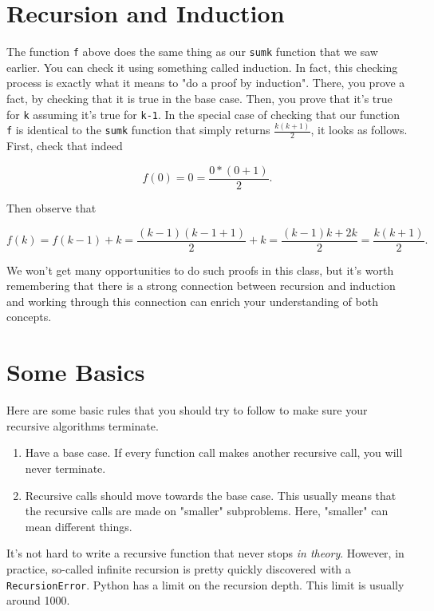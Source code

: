 \section{Recursion and Induction}


The function \texttt{f} above does the same thing as our \texttt{sumk} function that we saw earlier.
You can check it using something called induction.
In fact, this checking process is exactly what it means to "do a proof by induction".
There, you prove a fact, by checking that it is true in the base case.
Then, you prove that it's true for \texttt{k} assuming it's true for \texttt{k-1}.
In the special case of checking that our function \texttt{f} is identical to the \texttt{sumk} function that simply returns $\frac{k(k+1)}{2}$, it looks as follows.
First, check that indeed


\[
  f(0) = 0 = \frac{0 * (0 + 1)}{2}.
\]


Then observe that


\[
    f(k) = f(k-1) + k = \frac{(k-1)(k-1 + 1)}{2} + k = \frac{(k-1)k + 2k}{2} = \frac{k(k+1)}{2}.
\]


We won't get many opportunities to do such proofs in this class, but it's worth remembering that there is a strong connection between recursion and induction and working through this connection can enrich your understanding of both concepts.

\section{Some Basics}


Here are some basic rules that you should try to follow to make sure your recursive algorithms terminate.

\begin{enumerate}

\item Have a base case.  If every function call makes another recursive call, you will never terminate.

\item Recursive calls should move towards the base case.  This usually means that the recursive calls are made on "smaller" subproblems.  Here, "smaller" can mean different things.

\end{enumerate}

It's not hard to write a recursive function that never stops \emph{in theory}.
However, in practice, so-called infinite recursion is pretty quickly discovered with a \texttt{RecursionError}.
Python has a limit on the recursion depth.
This limit is usually around 1000.

